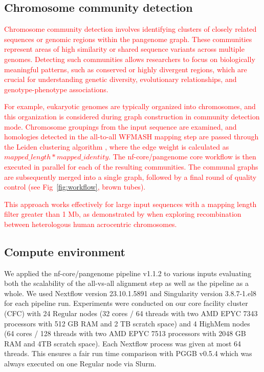 \documentclass{bioinfo}
\theoremstyle{definition}
\newcommand{\red}[1]{{\textcolor{Red}{#1}}}
\begin{document}
	\subsection{Chromosome community detection}
	\label{community}
	
	\red{Chromosome community detection involves identifying clusters of closely related sequences or genomic regions within the pangenome graph. These communities represent areas of high similarity or shared sequence variants across multiple genomes. Detecting such communities allows researchers to focus on biologically meaningful patterns, such as conserved or highly divergent regions, which are crucial for understanding genetic diversity, evolutionary relationships, and genotype-phenotype associations.}
	
	\red{For example, eukaryotic genomes are typically organized into chromosomes, and this organization is considered during graph construction in community detection mode. Chromosome groupings from the input sequence are examined, and homologies detected in the all-to-all WFMASH mapping step are passed through the Leiden clustering algorithm \citep{Traag2019}, where the edge weight is calculated as $mapped\_length * mapped\_identity$. The nf-core/pangenome core workflow is then executed in parallel for each of the resulting communities. The communal graphs are subsequently merged into a single graph, followed by a final round of quality control (see Fig~\ref{fig:workflow}, brown tubes).}
	
	\red{This approach works effectively for large input sequences with a mapping length filter greater than 1 Mb, as demonstrated by \cite{Guarracino2023} when exploring recombination between heterologous human acrocentric chromosomes.}
	
	\subsection{Compute environment}
	
	We applied the nf-core/pangenome pipeline v1.1.2 to various inputs evaluating both the scalability of the all-vs-all alignment step as well as the pipeline as a whole. 
	We used Nextflow version 23.10.1.5891 and Singularity version 3.8.7-1.el8 for each pipeline run. 
	Experiments were conducted on our core facility cluster (CFC) with 24 Regular nodes (32 cores / 64 threads with two AMD EPYC 7343 processors with 512 GB RAM and 2 TB scratch space) and 4 HighMem nodes (64 cores / 128 threads with two AMD EPYC 7513 processors with 2048 GB RAM and 4TB scratch space). 
	Each Nextflow process was given at most 64 threads. This ensures a fair run time comparison with PGGB v0.5.4 which was always executed on one Regular node via Slurm.
	
\end{document}
